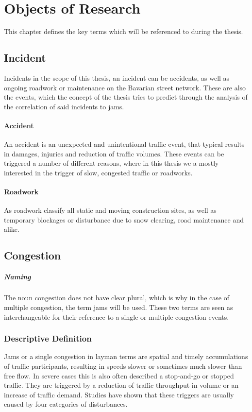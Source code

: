 \documentclass[a4paper,headsepline,footsepline,fontsize=11pt,BCOR=12mm,DIV=12]{report}
\begin{document}
\chapter{Objects of Research}
	This chapter defines the key terms which will be referenced to during the thesis.
\section{Incident}
		Incidents in the scope of this thesis, an incident can be accidents, as well as ongoing roadwork or maintenance on the Bavarian street network. These are also the events, which the concept of the thesis tries to predict through the analysis of the correlation of said incidents to jams.
	\subsubsection{Accident}
		An accident is an unexpected and unintentional traffic event, that typical results in damages, injuries and reduction of traffic volumes. These events can be triggered a number of different reasons, where in this thesis we a mostly interested in the trigger of slow, congested traffic or roadworks.
	\subsubsection{Roadwork}
		As roadwork classify all static and moving construction sites, as well as temporary blockages or disturbance due to snow clearing, road maintenance and alike. 
	
\section{Congestion}
\label{definition_congestion}

\paragraph{Naming} The noun congestion does not have clear plural, which is why in the case of multiple congestion, the term jams will be used. These two terms are seen as interchangeable for their reference to a single or multiple congestion events.

\subsection{Descriptive Definition}

Jams or a single congestion in layman terms are spatial and timely accumulations of traffic participants, resulting in speeds slower or sometimes much slower than free flow. In severe cases this is also often described a stop-and-go or stopped traffic. They are triggered by a reduction of traffic throughput in volume or an increase of traffic demand. Studies have shown that these triggers are usually caused by four categories of disturbances. \cite{TRB2003,FHA2011}
\end{document}

